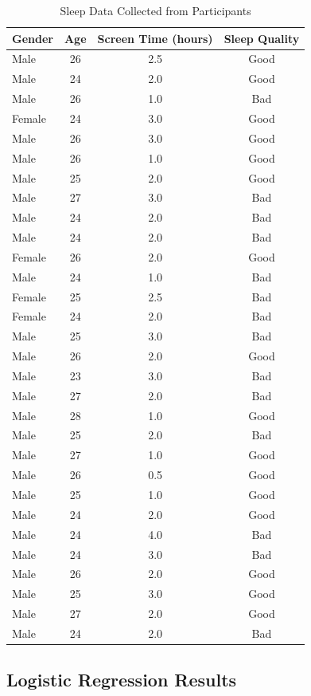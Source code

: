 \documentclass[conference]{IEEEtran}
\begin{document}
\begin{table}[htbp]
\begin{center}
\begin{tabular}{|l|c|c|c|}
\hline
\textbf{Gender} & \textbf{Age} & \textbf{Screen Time (hours)} & \textbf{Sleep Quality} \\
\hline
Male & 26 & 2.5 & Good \\
Male & 24 & 2.0 & Good \\
Male & 26 & 1.0 & Bad \\
Female & 24 & 3.0 & Good \\
Male & 26 & 3.0 & Good \\
Male & 26 & 1.0 & Good \\
Male & 25 & 2.0 & Good \\
Male & 27 & 3.0 & Bad \\
Male & 24 & 2.0 & Bad \\
Male & 24 & 2.0 & Bad \\
Female & 26 & 2.0 & Good \\
Male & 24 & 1.0 & Bad \\
Female & 25 & 2.5 & Bad \\
Female & 24 & 2.0 & Bad \\
Male & 25 & 3.0 & Bad \\
Male & 26 & 2.0 & Good \\
Male & 23 & 3.0 & Bad \\
Male & 27 & 2.0 & Bad \\
Male & 28 & 1.0 & Good \\
Male & 25 & 2.0 & Bad \\
Male & 27 & 1.0 & Good \\
Male & 26 & 0.5 & Good \\
Male & 25 & 1.0 & Good \\
Male & 24 & 2.0 & Good \\
Male & 24 & 4.0 & Bad \\
Male & 24 & 3.0 & Bad \\
Male & 26 & 2.0 & Good \\
Male & 25 & 3.0 & Good \\
Male & 27 & 2.0 & Good \\
Male & 24 & 2.0 & Bad \\
\hline
\end{tabular}
\end{center}
\caption{Sleep Data Collected from Participants}
\label{tab:sleep_data}
\end{table}

\subsection{Logistic Regression Results}
\end{document}
